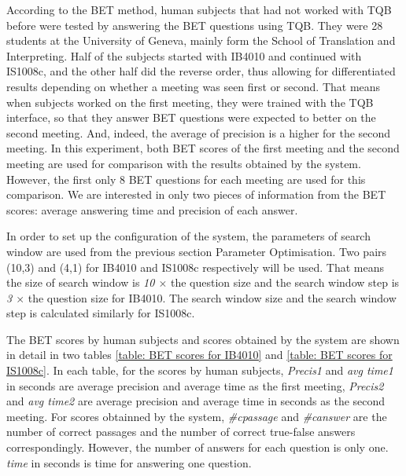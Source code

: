 According to the BET method, human subjects that had not worked with TQB before were tested by answering the BET questions using TQB. They were 28 students at the University of Geneva, mainly form the School of Translation and Interpreting. Half of the subjects started with IB4010 and continued with IS1008c, and the other half did the reverse order, thus allowing for differentiated results depending on whether a meeting was seen first or second. That means when subjects worked on the first meeting, they were trained with the TQB interface, so that they answer BET questions were expected to better on the second meeting. And, indeed, the average of precision is a higher for the second meeting. In this experiment, both BET scores of the first meeting and the second meeting are used for comparison with the results obtained by the system. However, the first only 8 BET questions for each meeting are used for this comparison.  We are interested in only two pieces of information from the BET scores: average answering time and precision of each answer. 

In order to set up the configuration of the system, the parameters of search window are used from the previous section Parameter Optimisation. Two pairs (10,3) and (4,1) for IB4010 and IS1008c respectively will be used. That means the size of search window is \textit{10 \ensuremath{\times}} the question size and the search window step is \textit{3 \ensuremath{\times}} the question size for IB4010. The search window size and the search window step is calculated similarly for IS1008c.

The BET scores by human subjects and scores obtained by the system are shown in detail in two tables \ref{table: BET scores for IB4010} and \ref{table: BET scores for IS1008c}. In each table, for the scores by human subjects, \textit{Precis1} and \textit{avg time1} in seconds are average precision and average time as the first meeting, \textit{Precis2} and \textit{avg time2} are average precision and average time in seconds as the second meeting. For scores obtainned by the system, \textit{\#cpassage} and \textit{\#canswer} are the number of correct passages and the number of correct true-false answers correspondingly. However, the number of answers for each question is only one. \textit{time} in seconds is time for answering one question.




